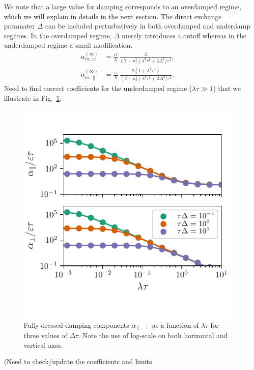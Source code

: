 We note that a large value for damping corresponds to an overdamped regime, which we will explain in details in the next section. The direct exchange paramater $\Delta$ can be included perturbatively in both overdamped and underdamp regimes. In the overdamped regime,  $\Delta$ merely introduces a cutoff whereas in the underdamped regime a small modification.
\begin{align}
\label{eq:alphaparallelzerodelta}
    \alpha_{m,zz}^{(\infty)} &= \frac{\epsilon \tau}{\hbar}\, \frac{2}{(2-n_z^2)\lambda^2\tau^2+2\Delta^2/\varepsilon^2},\\
    \alpha_{m,\parallel}^{(\infty)} &= \frac{\varepsilon\tau}{\hbar}\,\frac{2(1+\lambda^2\tau^2)}{(2-n_z^2)\lambda^2\tau^2+2\Delta^2/\varepsilon^2}.
\end{align}
{\color{blue} Need to find correct coefficients for the underdamped regime ($\lambda\tau\gg1$)}
that we illustrate in Fig.~\ref{fig:alpha3}.
\begin{figure}
    \centering
    \includegraphics{gfx/Chapter04/alpha_plot1.pdf}
    \caption{Fully dressed damping components $\alpha_{\parallel,\perp}$ as a function of $\lambda\tau$ for three values of $\Delta\tau$. Note the use of log-scale on both horizontal and vertical axes.}
    \label{fig:alpha3}
\end{figure}
{\color{blue} (Need to check/update the coefficients and limits. }
%
%
